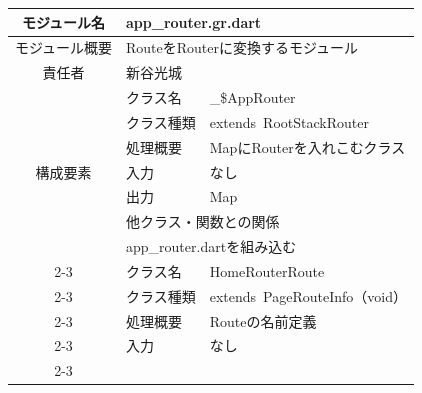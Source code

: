 \begin{longtable}{|c|l|l|} \hline
      モジュール名                & \multicolumn{2}{l|}{app\_router.gr.dart}                                                          \\ \hline
      モジュール概要               & \multicolumn{2}{p{12cm}|}{RouteをRouterに変換するモジュール}                                                 \\ \hline
      責任者                   & \multicolumn{2}{l|}{新谷光城}                                                                         \\ \hline
      \multirow{7}{*}{構成要素} & クラス名                                              & \_\$AppRouter                                 \\ \cline{2-3}
                            & クラス種類                                             & extends\ RootStackRouter                      \\ \cline{2-3}
                            & 処理概要                                              & \multicolumn{1}{p{12cm}|}{MapにRouterを入れこむクラス} \\ \cline{2-3}
                            & 入力                                                & なし                                            \\ \cline{2-3}
                            & 出力                                                & Map                                           \\ \cline{2-3}
                            & \multicolumn{2}{l|}{他クラス・関数との関係}                                                                  \\ \cline{2-3}
                            & \multicolumn{2}{p{14cm}|}{app\_router.dartを組み込む}                                                  \\ \cline{2-3}
                            & クラス名                                              & HomeRouterRoute                               \\ \cline{2-3}
                            & クラス種類                                             & extends\ PageRouteInfo（void）                  \\ \cline{2-3}
                            & 処理概要                                              & \multicolumn{1}{p{12cm}|}{Routeの名前定義}         \\ \cline{2-3}
                            & 入力                                                & なし                                            \\ \cline{2-3}

\end{longtable}
